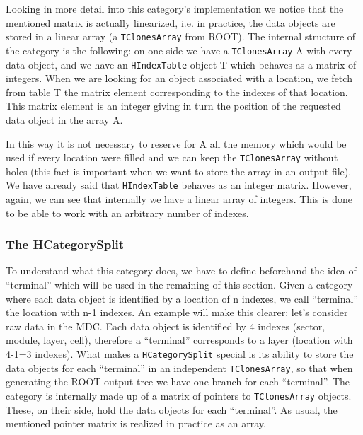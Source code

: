 Looking in more detail into this category's implementation we notice that 
the mentioned matrix is actually linearized, i.e. in practice, the data 
objects are stored in a linear array (a \verb+TClonesArray+ from ROOT).
The internal structure of the category is the following: on one side we 
have a \verb+TClonesArray+ A with every data object, and we have an 
\verb+HIndexTable+ object T which behaves as a matrix of integers. When 
we are looking for an object associated with a location, we fetch from 
table T the matrix element corresponding to the indexes of that location. 
This matrix element is an integer giving in turn the position of the 
requested data object in the array A.

In this way it is not necessary to reserve for A all the memory which 
would be used if every location were filled and we can keep the 
\verb+TClonesArray+ without holes (this fact is important when we want 
to store the array in an output file). We have already said that 
\verb+HIndexTable+ behaves as an integer matrix. However, again, we can 
see that internally we have a linear array of integers. This is done to 
be able to work with an arbitrary number of indexes. 

\subsubsection{The HCategorySplit}\label{Chapter_catsplit}

To understand what this category does, we have to define beforehand the 
idea of ``terminal'' which will be used in the remaining of this section. 
Given a category where each data object is identified by a location of n 
indexes, we call ``terminal'' the location with n-1 indexes. An example 
will make this clearer: let's consider raw data in the MDC. Each data 
object is identified by 4 indexes (sector, module, layer, cell), therefore 
a ``terminal'' corresponds to a layer (location with 4-1=3 indexes).
What makes a \verb+HCategorySplit+ special is its ability to store the 
data objects for each ``terminal'' in an independent \verb+TClonesArray+, 
so that when generating the ROOT output tree we have one branch for 
each ``terminal''.
The category is internally made up of a matrix of pointers to 
\verb+TClonesArray+ objects. These, on their side, hold the data objects 
for each ``terminal''. As usual, the mentioned pointer matrix is realized 
in practice as an array. 


